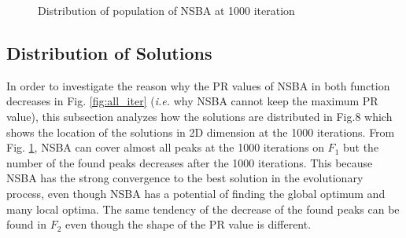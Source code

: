 \documentclass{ies2018}
\begin{document}
\begin{figure}[pb]
{\label{fig:f2_n100_1000}}

\caption{Distribution of population of NSBA at 1000 iteration }
\label{fig:results_nsba_1000}
\end{figure}

\subsection{Distribution of Solutions}
In order to investigate the reason why the PR values of NSBA in both function decreases in Fig. \ref{fig:all_iter} (\textit{i.e.} why NSBA cannot keep the maximum PR value), this subsection analyzes how the solutions are distributed in Fig.8 which shows the location of the solutions in 2D dimension at the 1000 iterations. From Fig. \ref{fig:results_nsba_1000}, NSBA can cover almost all peaks at the 1000 iterations on $F_1$ but the number of the found peaks decreases after the 1000 iterations. This because NSBA has the strong convergence to the best solution in the evolutionary process, even though NSBA has a potential of finding the global optimum and many local optima. The same tendency of the decrease of the found peaks can be found in $F_2$ even though the shape of the PR value is different.
\end{document}
